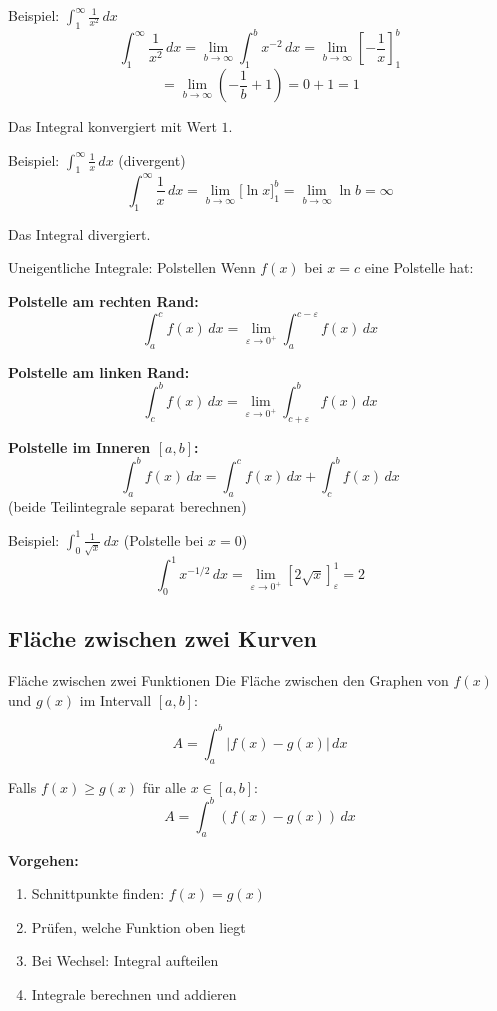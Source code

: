 \documentclass[a4paper,fontsize = 7pt]{scrartcl}
\begin{document}
\begin{subbox}{Beispiel: $\int_1^{\infty} \frac{1}{x^2}\,dx$}
$$\int_1^{\infty} \frac{1}{x^2}\,dx = \lim_{b \to \infty} \int_1^b x^{-2}\,dx = \lim_{b \to \infty} \left[-\frac{1}{x}\right]_1^b$$
$$= \lim_{b \to \infty} \left(-\frac{1}{b} + 1\right) = 0 + 1 = 1$$

Das Integral konvergiert mit Wert $1$.
\end{subbox}

\begin{subbox}{Beispiel: $\int_1^{\infty} \frac{1}{x}\,dx$ (divergent)}
$$\int_1^{\infty} \frac{1}{x}\,dx = \lim_{b \to \infty} \Big[\ln x\Big]_1^b = \lim_{b \to \infty} \ln b = \infty$$

Das Integral divergiert.
\end{subbox}

\begin{mainbox}{Uneigentliche Integrale: Polstellen}
Wenn $f(x)$ bei $x = c$ eine Polstelle hat:

\textbf{Polstelle am rechten Rand:}
$$\int_a^{c} f(x)\,dx = \lim_{\varepsilon \to 0^+} \int_a^{c-\varepsilon} f(x)\,dx$$

\textbf{Polstelle am linken Rand:}
$$\int_{c}^{b} f(x)\,dx = \lim_{\varepsilon \to 0^+} \int_{c+\varepsilon}^{b} f(x)\,dx$$

\textbf{Polstelle im Inneren $[a, b]$:}
$$\int_a^{b} f(x)\,dx = \int_a^{c} f(x)\,dx + \int_c^{b} f(x)\,dx$$
(beide Teilintegrale separat berechnen)
\end{mainbox}

\begin{subbox}{Beispiel: $\int_0^{1} \frac{1}{\sqrt{x}}\,dx$ (Polstelle bei $x=0$)}
$$\int_0^{1} x^{-1/2}\,dx = \lim_{\varepsilon \to 0^+} \left[2\sqrt{x}\right]_{\varepsilon}^{1} = 2$$
\end{subbox}

\subsection{Fläche zwischen zwei Kurven}

\begin{mainbox}{Fläche zwischen zwei Funktionen}
Die Fläche zwischen den Graphen von $f(x)$ und $g(x)$ im Intervall $[a, b]$:

$$\boxed{A = \int_a^b |f(x) - g(x)|\,dx}$$

Falls $f(x) \geq g(x)$ für alle $x \in [a, b]$:
$$A = \int_a^b (f(x) - g(x))\,dx$$

\textbf{Vorgehen:}
\begin{enumerate}
	\item Schnittpunkte finden: $f(x) = g(x)$
	\item Prüfen, welche Funktion oben liegt
	\item Bei Wechsel: Integral aufteilen
	\item Integrale berechnen und addieren
\end{enumerate}
\end{mainbox}
\end{document}
